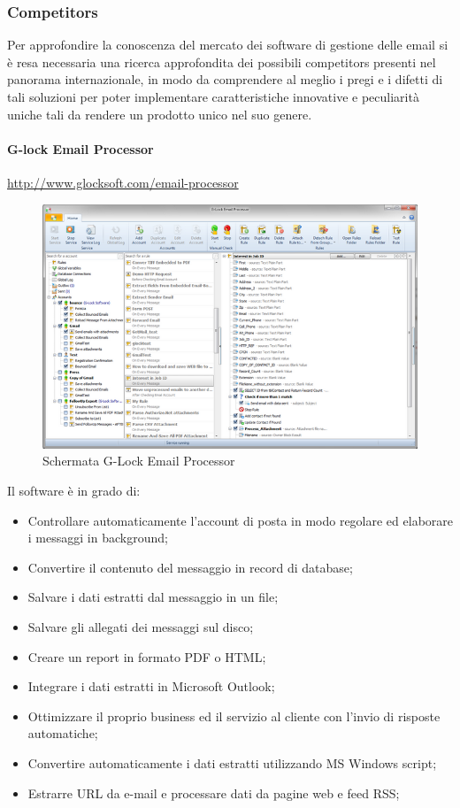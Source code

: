 \subsubsection{Competitors}
Per approfondire la conoscenza del mercato dei software di gestione delle email si è resa necessaria una ricerca approfondita dei possibili competitors presenti nel panorama internazionale, in modo da comprendere al meglio i pregi e i difetti di tali soluzioni per poter implementare caratteristiche innovative e peculiarità uniche tali da rendere \NOMEPROGETTO{} un prodotto unico nel suo genere.

\paragraph{G-lock Email Processor} 
\url{http://www.glocksoft.com/email-processor}

\begin{figure}[H]
\centering
\includegraphics[scale=0.5]{img/gep-main-window-1.png}
\caption{Schermata G-Lock Email Processor}
\end{figure}

Il software è in grado di:
\begin{itemize}
\item Controllare automaticamente l'account di posta in modo regolare ed elaborare i messaggi in background;
\item Convertire il contenuto del messaggio in record di database;
\item Salvare i dati estratti dal messaggio in un file;
\item Salvare gli allegati dei messaggi sul disco;
\item Creare un report in formato PDF o HTML;
\item Integrare i dati estratti in Microsoft Outlook;
\item Ottimizzare il proprio business ed il servizio al cliente con l'invio di risposte automatiche;
\item Convertire automaticamente i dati estratti utilizzando MS Windows script;
\item Estrarre URL da e-mail e processare dati da pagine web e feed RSS;
\end{itemize}

